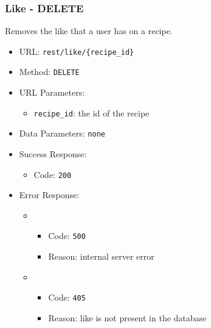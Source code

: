 \subsubsection*{Like - DELETE}
Removes the like that a user has on a recipe.
\begin{itemize}
    \item URL: \texttt{rest/like/\{recipe\_id\}}
    \item Method: \texttt{DELETE}
    \item URL Parameters:
    \begin{itemize}
        \item \texttt{recipe\_id}: the id of the recipe
    \end{itemize}
    \item Data Parameters: \texttt{none}
    \item Success Response:
    \begin{itemize}
        \item Code: \texttt{200}
    \end{itemize}
    \item Error Response:
    \begin{itemize}
        \item \begin{itemize}
                \item Code: \texttt{500}
                \item Reason: internal server error
                \end{itemize}
        \item \begin{itemize}
                \item Code: \texttt{405}
                \item Reason: like is not present in the database
                \end{itemize}
    \end{itemize}
\end{itemize}

